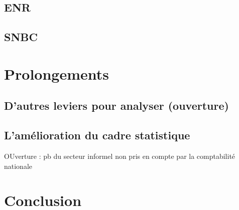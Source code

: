 \documentclass[
]{article}
\begin{document}
\hypertarget{enr-1}{%
\subsection{ENR}\label{enr-1}}

\hypertarget{snbc-1}{%
\subsection{SNBC}\label{snbc-1}}

\hypertarget{prolongements}{%
\section{Prolongements}\label{prolongements}}

\hypertarget{dautres-leviers-pour-analyser-ouverture}{%
\subsection{D'autres leviers pour analyser
(ouverture)}\label{dautres-leviers-pour-analyser-ouverture}}

\hypertarget{lamuxe9lioration-du-cadre-statistique}{%
\subsection{L'amélioration du cadre
statistique}\label{lamuxe9lioration-du-cadre-statistique}}

OUverture : pb du secteur informel non pris en compte par la
comptabilité nationale

\hypertarget{conclusion}{%
\section{Conclusion}\label{conclusion}}

\printbibliography[title=Bibliographie]
\end{document}
